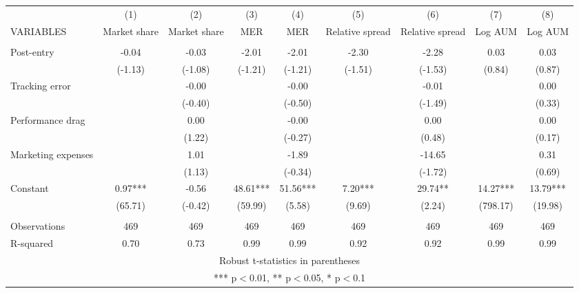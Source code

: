 \documentclass[]{article}
\begin{document}
\begin{tabular}{lcccccccc} \hline
 & (1) & (2) & (3) & (4) & (5) & (6) & (7) & (8) \\
VARIABLES & Market share & Market share & MER & MER & Relative spread & Relative spread & Log AUM & Log AUM \\ \hline
 &  &  &  &  &  &  &  &  \\
Post-entry & -0.04 & -0.03 & -2.01 & -2.01 & -2.30 & -2.28 & 0.03 & 0.03 \\
 & (-1.13) & (-1.08) & (-1.21) & (-1.21) & (-1.51) & (-1.53) & (0.84) & (0.87) \\
Tracking error &  & -0.00 &  & -0.00 &  & -0.01 &  & 0.00 \\
 &  & (-0.40) &  & (-0.50) &  & (-1.49) &  & (0.33) \\
Performance drag &  & 0.00 &  & -0.00 &  & 0.00 &  & 0.00 \\
 &  & (1.22) &  & (-0.27) &  & (0.48) &  & (0.17) \\
Marketing expenses &  & 1.01 &  & -1.89 &  & -14.65 &  & 0.31 \\
 &  & (1.13) &  & (-0.34) &  & (-1.72) &  & (0.69) \\
Constant & 0.97*** & -0.56 & 48.61*** & 51.56*** & 7.20*** & 29.74** & 14.27*** & 13.79*** \\
 & (65.71) & (-0.42) & (59.99) & (5.58) & (9.69) & (2.24) & (798.17) & (19.98) \\
 &  &  &  &  &  &  &  &  \\
Observations & 469 & 469 & 469 & 469 & 469 & 469 & 469 & 469 \\
 R-squared & 0.70 & 0.73 & 0.99 & 0.99 & 0.92 & 0.92 & 0.99 & 0.99 \\ \hline
\multicolumn{9}{c}{ Robust t-statistics in parentheses} \\
\multicolumn{9}{c}{ *** p$<$0.01, ** p$<$0.05, * p$<$0.1} \\
\end{tabular}
\end{document}
